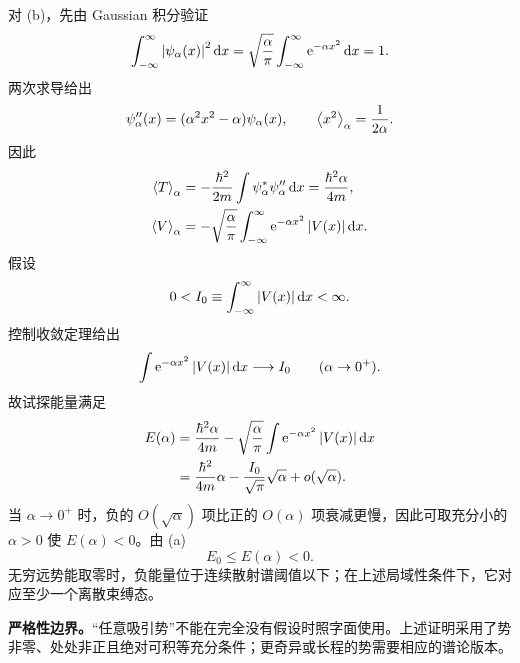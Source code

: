 \begin{checkedsolution}
对 (b)，先由 Gaussian 积分验证
\begin{equation}
  \int_{-\infty}^{\infty}\left|\psi_\alpha(x)\right|^2\mathop{}\!\mathrm{d} x
  =\sqrt{\frac\alpha\pi}
  \int_{-\infty}^{\infty}\mathrm{e}^{-\alpha x^2}\mathop{}\!\mathrm{d} x=1.
  \label{eq:QM-C05-S02-E02-normalization}
\end{equation}
两次求导给出
\begin{equation}
  \psi_\alpha''(x)
  =(\alpha^2x^2-\alpha)\psi_\alpha(x),
  \qquad
  \left\langle x^2 \right\rangle_\alpha=\frac1{2\alpha}.
  \label{eq:QM-C05-S02-E02-gaussian-derivatives}
\end{equation}
因此
\begin{align}
  \left\langle T \right\rangle_\alpha
  &=-\frac{\hbar^2}{2m}
  \int\psi_\alpha^*\psi_\alpha''\mathop{}\!\mathrm{d} x
  =\frac{\hbar^2\alpha}{4m},
  \label{eq:QM-C05-S02-E02-kinetic}\\
  \left\langle V \right\rangle_\alpha
  &=-\sqrt{\frac\alpha\pi}
  \int_{-\infty}^{\infty}
  \mathrm{e}^{-\alpha x^2}\left|V(x)\right|\mathop{}\!\mathrm{d} x.
  \label{eq:QM-C05-S02-E02-potential}
\end{align}
假设
\begin{equation}
  0<I_0\equiv
  \int_{-\infty}^{\infty}\left|V(x)\right|\mathop{}\!\mathrm{d} x<\infty.
  \label{eq:QM-C05-S02-E02-localized-assumption}
\end{equation}
控制收敛定理给出
\begin{equation}
  \int\mathrm{e}^{-\alpha x^2}\left|V(x)\right|\mathop{}\!\mathrm{d} x
  \longrightarrow I_0
  \qquad(\alpha\to0^+).
  \label{eq:QM-C05-S02-E02-dominated-limit}
\end{equation}
故试探能量满足
\begin{align}
  E(\alpha)
  &=\frac{\hbar^2\alpha}{4m}
  -\sqrt{\frac\alpha\pi}
  \int\mathrm{e}^{-\alpha x^2}\left|V(x)\right|\mathop{}\!\mathrm{d} x
  \notag\\
  &=\frac{\hbar^2}{4m}\alpha
  -\frac{I_0}{\sqrt\pi}\sqrt\alpha
  +o(\sqrt\alpha).
  \label{eq:QM-C05-S02-E02-trial-energy}
\end{align}
当 $\alpha\to0^+$ 时，负的 $O(\sqrt\alpha)$ 项比正的 $O(\alpha)$ 项衰减更慢，因此可取充分小的 $\alpha>0$ 使 $E(\alpha)<0$。由 (a)
\begin{equation}
  E_0\leq E(\alpha)<0.
  \label{eq:QM-C05-S02-E02-negative-ground}
\end{equation}
无穷远势能取零时，负能量位于连续散射谱阈值以下；在上述局域性条件下，它对应至少一个离散束缚态。

\textbf{严格性边界。}“任意吸引势”不能在完全没有假设时照字面使用。上述证明采用了势非零、处处非正且绝对可积等充分条件；更奇异或长程的势需要相应的谱论版本。
\end{checkedsolution}

